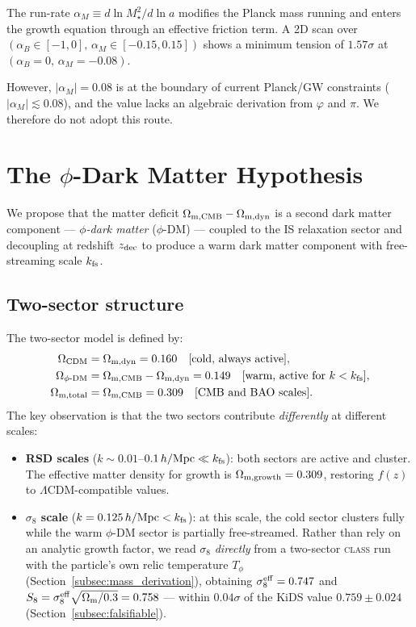 \documentclass[12pt,a4paper]{article}
\newcommand{\phiDM}{\phi\text{-DM}}
\newcommand{\kfs}{k_{\rm fs}}
\newcommand{\sigeff}{\sigma_8^{\rm eff}}
\begin{document}
The run-rate $\alpha_M \equiv d\ln M_\star^2/d\ln a$ modifies the Planck mass
running and enters the growth equation through an effective friction term. A 2D
scan over $(\alpha_B \in [-1, 0],\, \alpha_M \in [-0.15, 0.15])$ shows a minimum
tension of $1.57\sigma$ at $(\alpha_B = 0,\, \alpha_M = -0.08)$.

However, $|\alpha_M| = 0.08$ is at the boundary of current Planck/GW constraints
($|\alpha_M| \lesssim 0.08$), and the value lacks an algebraic derivation from
$\varphi$ and $\pi$. We therefore do not adopt this route.

\section{The $\phi$-Dark Matter Hypothesis}
\label{sec:phiDM}

We propose that the matter deficit $\Omega_{\rm m,CMB}-\Omega_{\rm m,dyn}$ is a second
dark matter component —
\emph{$\phi$-dark matter} ($\phiDM$) — coupled to the IS relaxation sector and
decoupling at redshift $z_{\rm dec}$ to produce a warm dark matter component
\citep{Bode2001} with free-streaming scale $\kfs$.

\subsection{Two-sector structure}
\label{subsec:two_sector}

The two-sector model is defined by:
\begin{align}
  \Omega_{\rm CDM}    &= \Omega_{\rm m,dyn} = 0.160 \quad [\text{cold, always active}],\\
  \Omega_{\phiDM}     &= \Omega_{\rm m,CMB} - \Omega_{\rm m,dyn} = 0.149
    \quad [\text{warm, active for } k < \kfs],\\
  \Omega_{\rm m,total} &= \Omega_{\rm m,CMB} = 0.309 \quad [\text{CMB and BAO scales}].
\end{align}
The key observation is that the two sectors contribute \emph{differently} at
different scales:

\begin{itemize}
  \item \textbf{RSD scales} ($k \sim 0.01$--$0.1\,h/\mathrm{Mpc} \ll \kfs$):
    both sectors are active and cluster. The effective matter density for growth
    is $\Omega_{\rm m,growth} = 0.309$, restoring $f(z)$ to
    $\Lambda$CDM-compatible values.
  \item \textbf{$\sigma_8$ scale} ($k = 0.125\,h/\mathrm{Mpc} < \kfs$):
    at this scale, the cold sector clusters fully while the warm $\phi$-DM sector
    is partially free-streamed. Rather than rely on an analytic growth factor, we
    read $\sigma_8$ \emph{directly} from a two-sector \textsc{class} run with the
    particle's own relic temperature $T_\phi$ (Section~\ref{subsec:mass_derivation}),
    obtaining $\sigeff = 0.747$ and
    $S_8 = \sigeff\sqrt{\Omega_{\rm m}/0.3} = 0.758$ --- within $0.04\sigma$ of the
    KiDS value $0.759\pm0.024$ (Section~\ref{subsec:falsifiable}).
\end{itemize}
\end{document}
